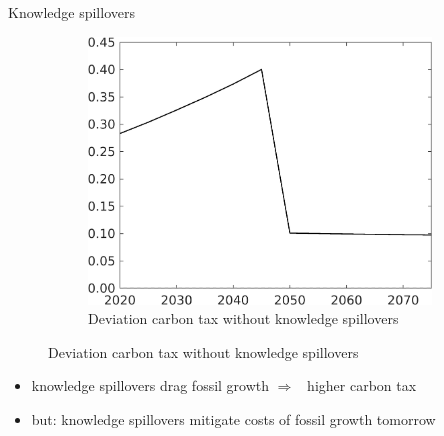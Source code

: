 \documentclass[11pt,aspectratio=169]{beamer}
\newcommand{\ar}{$\Rightarrow$ \ }
\begin{document}
\begin{frame}{Knowledge spillovers}
\begin{figure}[h!!]
\begin{subfigure}{0.32\textwidth}
	\end{subfigure}
	\begin{subfigure}{0.32\textwidth}		
		\caption{Deviation carbon tax without knowledge spillovers}
		\includegraphics[width=1\textwidth]{../codding_model/own_basedOnFried/optimalPol_010922_revision/figures/all_13Sept22_Tplus30/Tauf_OPT_COMPtaulPer_regime4_spillover0_knspil1_noskill0_sep0_xgrowth0_PV1_etaa0.79.png}
	\end{subfigure}
\end{figure}
\vspace{5mm}
\begin{block}{}
\begin{itemize}
	\item knowledge spillovers drag fossil growth \ar higher carbon tax
	\item but: knowledge spillovers mitigate costs of fossil growth tomorrow
\end{itemize}
\end{block}	
\end{frame}
\end{document}
